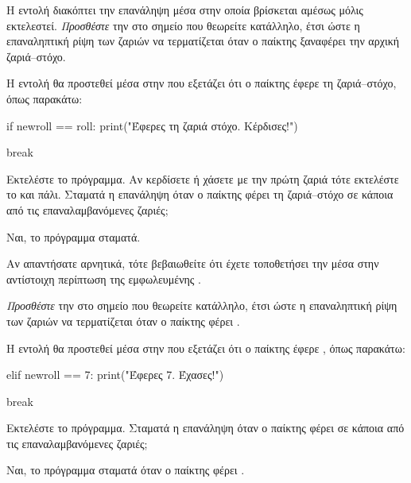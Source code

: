 \documentclass[a4paper,11pt,oneside]{book}
\begin{document}
\begin{step}
Η εντολή  διακόπτει την επανάληψη μέσα στην οποία βρίσκεται αμέσως μόλις εκτελεστεί. \emph{Προσθέστε} την  στο σημείο που θεωρείτε κατάλληλο, έτσι ώστε η επαναληπτική ρίψη των ζαριών να τερματίζεται όταν ο παίκτης ξαναφέρει την αρχική ζαριά--στόχο. 

\begin{answer}
Η εντολή  θα προστεθεί μέσα στην  που εξετάζει ότι ο παίκτης έφερε τη ζαριά--στόχο, όπως παρακάτω:

\begin{pyplain}
if newroll == roll:
    print("Έφερες τη ζαριά στόχο. Κέρδισες!")
\end{pyplain}
\begin{pynew}
    break
\end{pynew}
\end{answer}

Εκτελέστε το πρόγραμμα. Αν κερδίσετε ή χάσετε με την πρώτη ζαριά τότε εκτελέστε το και πάλι.
Σταματά η επανάληψη όταν ο παίκτης φέρει τη ζαριά--στόχο σε κάποια από τις επαναλαμβανόμενες ζαριές;

\begin{answer}
Ναι, το πρόγραμμα σταματά.
\end{answer}

\begin{note}
Αν απαντήσατε αρνητικά, τότε βεβαιωθείτε ότι έχετε τοποθετήσει την  μέσα στην αντίστοιχη περίπτωση της εμφωλευμένης .
\end{note}
\end{step}

\begin{step}
\emph{Προσθέστε} την  στο σημείο που θεωρείτε κατάλληλο, έτσι ώστε η επαναληπτική ρίψη των ζαριών να τερματίζεται όταν ο παίκτης φέρει .

\begin{answer}
Η εντολή  θα προστεθεί μέσα στην  που εξετάζει ότι ο παίκτης έφερε , όπως παρακάτω:

\begin{pyplain}
elif newroll == 7:
    print("Έφερες 7. Έχασες!")
\end{pyplain}
\begin{pynew}
    break
\end{pynew}
\end{answer}

Εκτελέστε το πρόγραμμα. Σταματά η επανάληψη όταν ο παίκτης φέρει  σε κάποια από τις επαναλαμβανόμενες ζαριές;

\begin{answer}
Ναι, το πρόγραμμα σταματά όταν ο παίκτης φέρει .
\end{answer}
\end{step}
\end{document}
